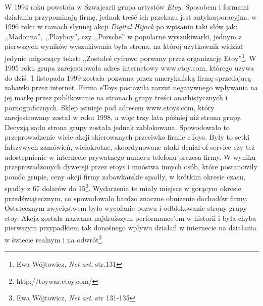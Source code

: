 \documentclass[a4paper,12pt,twoside]{article}
\begin{document}
W 1994 roku powstała w Szwajcarii grupa artystów \textit{Etoy}. Sposobem
i formami działania przypominają firmę, jednak treść ich przekazu jest
antykorporacyjna. w 1996 roku w ramach słynnej akcji \textit{Digital Hijack}
po wpisaniu taki słów jak: ,,Madonna'', ,,Playboy'', czy ,,Porsche''
w popularne wyszukiwarki, jednym z pierwszych wyników wyszukiwania była strona,
na której użytkownik widział jedynie migoczący tekst: ,,Zostałeś cyfrowo
porwany przez organizację
Etoy''\footnote{Ewa Wójtowicz, \textit{Net art}, str.131}.
W 1995 roku grupa zarejestrowała adres internetowy www.etoy.com, którego
używa do dziś. 1 listopada 1999 została pozwana przez amerykańską firmę
sprzedającą zabawki przez internet. Firma eToys postawiła zarzut
negatywnego wpływania na jej markę przez publikowanie na stronach grupy
treści anarhistycznych i pornograficznych. Sklep istnieje pod adresem
www.etoys.com, który zarejestrowany został w roku 1998, a więc trzy
lata później niż strona grupy. Decyzją sądu strona grupy została jednak
zablokowana. Spowodowało to przeprowadzenie wiele akcji skierowanych
przeciwko firmie eToys. Były to setki fałszywych zamówień, wielokrotne,
skoordynowane ataki denial-of-service czy też udostępnienie w internecie
prywatnego numeru telefonu prezesa firmy. W wyniku przeprowadzonych
dywersji przez etoys i mnóstwa innych osób, które postanowiły pomóc grupie,
ceny akcji firmy zabawkarskie spadły, w krótkim okresie czasu, spadły
z 67 dolarów do 15\footnote{http://toywar.etoy.com/}.
Wydarzenia te miały miejsce w gorącym okresie
przedświątecznym, co spowodowało bardzo znaczne obniżenie dochodów firmy.
Ostatecznym zwycięstwem było wycofanie pozwu i odblokowanie strony grupy
etoy. Akcja została nazwana najdroższym performance'em w historii i była
chyba pierwszym przypadkiem tak donośnego wpływu działań w internecie
na działania w świecie realnym i na
odwrót\footnote{Ewa Wójtowicz, \textit{Net art}, str 131-135}.
\end{document}
